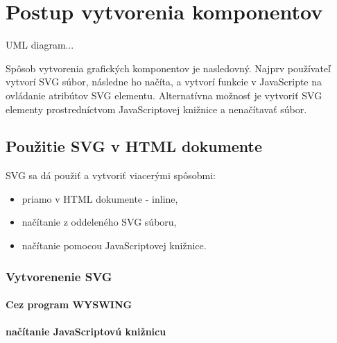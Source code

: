 \chapter{Postup vytvorenia komponentov}

UML diagram... 

Spôsob vytvorenia grafických komponentov je nasledovný. Najprv používateľ vytvorí SVG súbor, následne ho načíta, a vytvorí funkcie v JavaScripte na ovládanie atribútov SVG elementu. 
Alternatívna možnosť je vytvoriť SVG elementy prostredníctvom JavaScriptovej knižnice a nenačítavať súbor. 




\section{Použitie SVG v HTML dokumente}

SVG sa dá použiť a vytvoriť viacerými spôsobmi:
\begin{itemize}
	\item priamo v HTML dokumente - inline, 
	\item načítanie z oddeleného SVG súboru,
	\item načítanie pomocou JavaScriptovej knižnice.
\end{itemize}


 \subsection{Vytvorenenie SVG }
 
 \subsubsection{Cez program WYSWING}
 
 \subsubsection{načítanie JavaScriptovú knižnicu}

